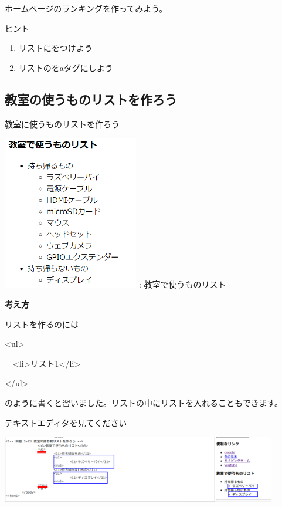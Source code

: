 \documentclass[a4paper,12pt]{jarticle}
\begin{document}
ホームページのランキングを作ってみよう。

ヒント

\begin{enumerate}
  \item リストにをつけよう
  \item リストのをaタグにしよう
\end{enumerate}

\clearpage
{}
\subsection{\theExercise 教室の使うものリストを作ろう}
教室に使うものリストを作ろう

\bigskip
\centering
\begin{minipage}{5.937cm}
  {\upshape
    \includegraphics[width=5.937cm]{textbook-img203.png}
    \newline
    : 教室で使うものリスト}
\end{minipage}

\bigskip
\flushleft

\textbf{考え方}



リストを作るのには

{\textless}ul{\textgreater}

\ \ {\textless}li{\textgreater}リスト1{\textless}/li{\textgreater}

{\textless}/ul{\textgreater}

のように書くと習いました。リストの中にリストを入れることもできます。

テキストエディタを見てください

\bigskip

\centering
\includegraphics[width=0.9\textwidth]{textbook-img204.png}
\end{document}
